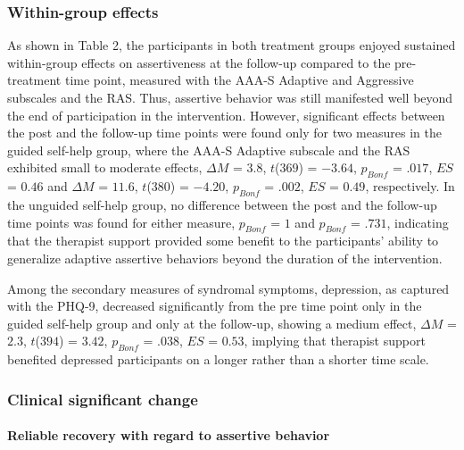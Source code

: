 \documentclass[3p]{elsarticle} %
\begin{document}
\hypertarget{within-group-effects}{%
\subsubsection{Within-group effects}\label{within-group-effects}}

As shown in Table 2, the participants in both treatment groups enjoyed
sustained within-group effects on assertiveness at the follow-up
compared to the pre-treatment time point, measured with the AAA-S
Adaptive and Aggressive subscales and the RAS. Thus, assertive behavior
was still manifested well beyond the end of participation in the
intervention. However, significant effects between the post and the
follow-up time points were found only for two measures in the guided
self-help group, where the AAA-S Adaptive subscale and the RAS exhibited
small to moderate effects, \(\Delta M\) = \(3.8\), \(t\)(\(369\)) =
\(-3.64\), \(p_{ Bonf }\) = \(.017\), \(ES\) = \(0.46\) and \(\Delta M\)
= \(11.6\), \(t\)(\(380\)) = \(-4.20\), \(p_{ Bonf }\) = \(.002\),
\(ES\) = \(0.49\), respectively. In the unguided self-help group, no
difference between the post and the follow-up time points was found for
either measure, \(p_{ Bonf }\) = \(1\) and \(p_{ Bonf }\) = \(.731\),
indicating that the therapist support provided some benefit to the
participants' ability to generalize adaptive assertive behaviors beyond
the duration of the intervention.

Among the secondary measures of syndromal symptoms, depression, as
captured with the PHQ-9, decreased significantly from the pre time point
only in the guided self-help group and only at the follow-up, showing a
medium effect, \(\Delta M\) = \(2.3\), \(t\)(\(394\)) = \(3.42\),
\(p_{ Bonf }\) = \(.038\), \(ES\) = \(0.53\), implying that therapist
support benefited depressed participants on a longer rather than a
shorter time scale.

\hypertarget{clinical-significant-change}{%
\subsubsection{Clinical significant
change}\label{clinical-significant-change}}

\hypertarget{reliable-recovery-with-regard-to-assertive-behavior}{%
\paragraph{Reliable recovery with regard to assertive
behavior}\label{reliable-recovery-with-regard-to-assertive-behavior}}
\end{document}
